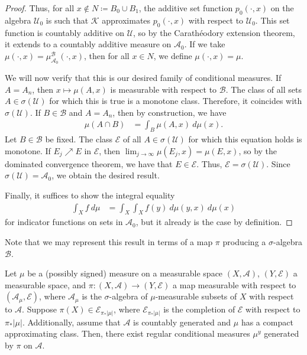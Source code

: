 \documentclass[10pt]{mypackage}
\renewcommand{\coloneq}{\coloneqq}
\begin{document}
\begin{proof}
  Thus, for all $x\notin N\coloneq B_0 \cup B_1$, the additive set function $p_0\left( \cdot,x \right)$ on the algebra $\mathcal{U}_0$ is such that $\mathcal{K}$ approximates $p_0\left( \cdot,x \right)$ with respect to $\mathcal{U}_0$. This set function is countably additive on $\mathcal{U}$, so by the Carathéodory extension theorem, it extends to a countably additive measure on $\mathcal{A}_0$. If we take $\mu\left( \cdot,x \right) = \mu^{\mathcal{B}}_{\mathcal{A}_0}\left( \cdot,x \right)$, then for all $x\in N$, we define $\mu\left( \cdot,x \right) = \mu$.

  We will now verify that this is our desired family of conditional measures. If $A = A_n$, then $x\mapsto \mu\left( A,x \right)$ is measurable with respect to $ \mathcal{B} $. The class of all sets $A\in \sigma\left( \mathcal{U} \right)$ for which this is true is a monotone class. Therefore, it coincides with $\sigma\left( \mathcal{U} \right)$. If $B\in \mathcal{B}$ and $A = A_n$, then by construction, we have
  \begin{align*}
    \mu\left( A\cap B \right) &= \int_{B}^{} \mu\left( A,x \right)\:d\mu(x).
  \end{align*}
  Let $B\in \mathcal{B}$ be fixed. The class $\mathcal{E}$ of all $A\in \sigma\left( \mathcal{U} \right)$ for which this equation holds is monotone. If $E_j\nearrow E$ in $\mathcal{E}$, then $\lim_{j\to\infty}\mu\left( E_j,x \right) = \mu\left( E,x \right)$, so by the dominated convergence theorem, we have that $E\in \mathcal{E}$. Thus, $\mathcal{E} = \sigma\left( \mathcal{U} \right)$. Since $\sigma\left( \mathcal{U} \right) = \mathcal{A}_0$, we obtain the desired result.

  Finally, it suffices to show the integral equality 
  \begin{align*}
    \int_{X}^{} f\:d\mu &= \int_{X}^{} \int_{X}^{} f(y)\:d\mu\left( y,x \right)\:d\mu(x)
  \end{align*}
  for indicator functions on sets in $ \mathcal{A}_0 $, but it already is the case by definition.
\end{proof}
Note that we may represent this result in terms of a map $\pi$ producing a $\sigma$-algebra $\mathcal{B}$.
\begin{theorem}
  Let $\mu$ be a (possibly signed) measure on a measurable space $\left( X,\mathcal{A} \right)$, $\left( Y,\mathcal{E} \right)$ a measurable space, and $\pi\colon \left( X,\mathcal{A} \right)\to \left( Y,\mathcal{E} \right)$ a map measurable with respect to $\left( \mathcal{A}_{\mu},\mathcal{E} \right)$, where $\mathcal{A}_{\mu}$ is the $\sigma$-algebra of $\mu$-measurable subsets of $X$ with respect to $\mathcal{A}$. Suppose $\pi(X)\in \mathcal{E}_{\pi_{\ast}\left\vert \mu \right\vert}$, where $\mathcal{E}_{\pi_{\ast}\left\vert \mu \right\vert}$ is the completion of $\mathcal{E}$ with respect to $\pi_{\ast}\left\vert \mu \right\vert$. Additionally, assume that $\mathcal{A}$ is countably generated and $\mu$ has a compact approximating class. Then, there exist regular conditional measures $\mu^y$ generated by $\pi$ on $\mathcal{A}$.
\end{theorem}
\end{document}
